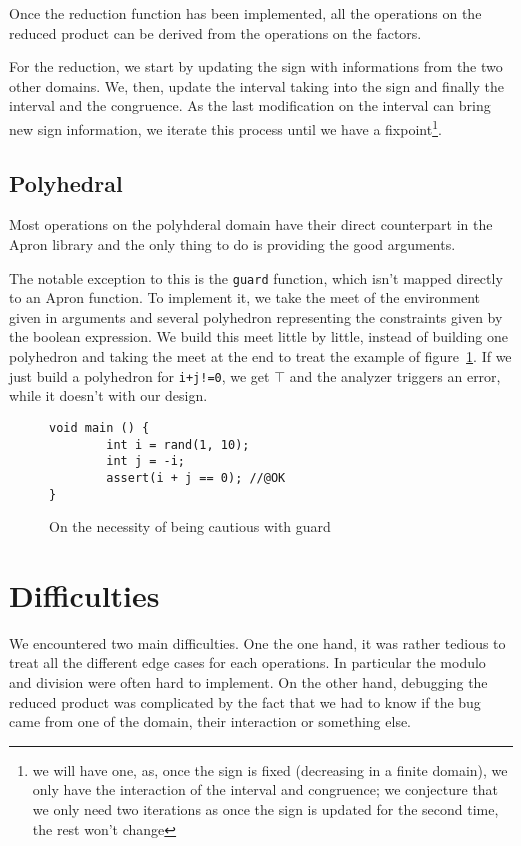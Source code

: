 \documentclass[11pt]{article}
\begin{document}
Once the reduction function has been implemented, all the operations on the
reduced product can be derived from the operations on the factors.

For the reduction, we start by updating the sign with informations from the two
other domains. We, then, update the interval taking into the sign and finally
the interval and the congruence. As the last modification on the interval can
bring new sign information, we iterate this process until we have a
fixpoint\footnote{we will have one, as, once the sign is fixed (decreasing in a
finite domain), we only have the interaction of the interval and congruence; we
conjecture that we only need two iterations as once the sign is updated for the
second time, the rest won't change}.
\subsection{Polyhedral}
Most operations on the polyhderal domain have their direct counterpart in the
\textsf{Apron} library and the only thing to do is providing the good arguments.

The notable exception to this is the \texttt{guard} function, which isn't mapped
directly to an \textsf{Apron} function. To implement it, we take the meet of the
environment given in arguments and several polyhedron representing the
constraints given by the boolean expression. We build this meet little by
little, instead of building one polyhedron and taking the meet at the end to
treat the example of figure~\ref{poly}. If we just build a polyhedron for
\texttt{i+j!=0}, we get $\top$ and the analyzer triggers an error, while
it doesn't with our design.
\begin{figure}[h]
\begin{verbatim}
void main () {
        int i = rand(1, 10);
        int j = -i;
        assert(i + j == 0); //@OK
}
\end{verbatim}
\caption{On the necessity of being cautious with guard}\label{poly}
\end{figure}
\section{Difficulties}
We encountered two main difficulties. One the one hand, it was rather tedious to
treat all the different edge cases for each operations. In particular the modulo
and division were often hard to implement. On the other hand, debugging the
reduced product was complicated by the fact that we had to know if the bug came
from one of the domain, their interaction or something else.
\end{document}
